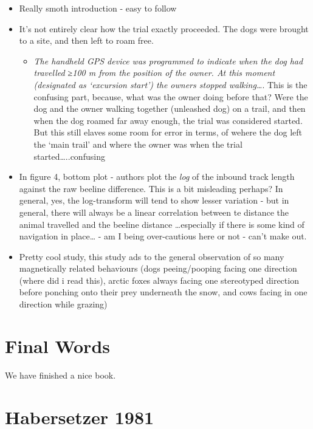 \documentclass[
]{book}
\providecommand{\tightlist}{%
  \setlength{\itemsep}{0pt}\setlength{\parskip}{0pt}}
\begin{document}
\begin{itemize}
\tightlist
\item
  Really smoth introduction - easy to follow
\item
  It's not entirely clear how the trial exactly proceeded. The dogs were brought to a site, and then left to roam free.

  \begin{itemize}
  \tightlist
  \item
    \emph{The handheld GPS device was programmed to indicate when the dog had travelled ≥100 m from the position of the owner. At this moment (designated as `excursion start') the owners stopped walking\ldots{}}. This is the confusing part, because, what was the owner doing before that? Were the dog and the owner walking together (unleashed dog) on a trail, and then when the dog roamed far away enough, the trial was considered started. But this still elaves some room for error in terms, of wehere the dog left the `main trail' and where the owner was when the trial started\ldots..confusing
  \end{itemize}
\item
  In figure 4, bottom plot - authors plot the \emph{log} of the inbound track length against the raw beeline difference. This is a bit misleading perhaps? In general, yes, the log-transform will tend to show lesser variation - but in general, there will always be a linear correlation between te distance the animal travelled and the beeline distance \ldots especially if there is some kind of navigation in place\ldots{} - am I being over-cautious here or not - can't make out.
\item
  Pretty cool study, this study ads to the general observation of so many magnetically related behaviours (dogs peeing/pooping facing one direction (where did i read this), arctic foxes always facing one stereotyped direction before ponching onto their prey underneath the snow, and cows facing in one direction while grazing)
\end{itemize}

\hypertarget{final-words}{%
\chapter{Final Words}\label{final-words}}

We have finished a nice book.

\hypertarget{habersetzermadurai}{%
\chapter{Habersetzer 1981}\label{habersetzermadurai}}
\end{document}
